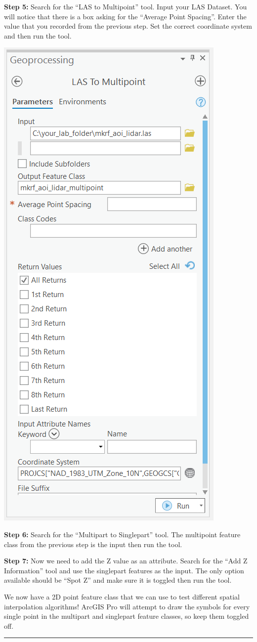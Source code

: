 \documentclass[
]{book}
\begin{document}
\textbf{Step 5:} Search for the ``LAS to Multipoint'' tool. Input your LAS Dataset. You will notice that there is a box asking for the ``Average Point Spacing''. Enter the value that you recorded from the previous step. Set the correct coordinate system and then run the tool.

\includegraphics[width=0.5\linewidth]{images/01-arcgis-las-to-multipoint}

\textbf{Step 6:} Search for the ``Multipart to Singlepart'' tool. The multipoint feature class from the previous step is the input then run the tool.

\textbf{Step 7:} Now we need to add the Z value as an attribute. Search for the ``Add Z Information'' tool and use the singlepart features as the input. The only option available should be ``Spot Z'' and make sure it is toggled then run the tool.

We now have a 2D point feature class that we can use to test different spatial interpolation algorithms! ArcGIS Pro will attempt to draw the symbols for every single point in the multipart and singlepart feature classes, so keep them toggled off.

\begin{center}\rule{0.5\linewidth}{0.5pt}\end{center}
\end{document}
